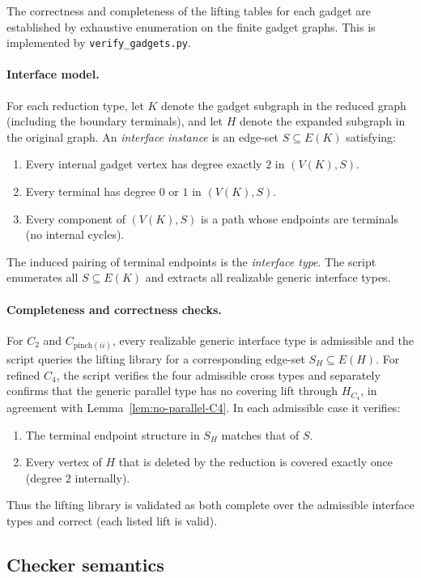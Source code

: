 \documentclass[12pt]{article}
\theoremstyle{definition}
\begin{document}
The correctness and completeness of the lifting tables for each gadget are established by exhaustive
enumeration on the finite gadget graphs. This is implemented by \texttt{verify\_gadgets.py}.

\paragraph{Interface model.}
For each reduction type, let $K$ denote the gadget subgraph in the reduced graph (including the
boundary terminals), and let $H$ denote the expanded subgraph in the original graph.
An \emph{interface instance} is an edge-set $S \subseteq E(K)$ satisfying:
\begin{enumerate}
  \item Every internal gadget vertex has degree exactly $2$ in $(V(K),S)$.
  \item Every terminal has degree $0$ or $1$ in $(V(K),S)$.
  \item Every component of $(V(K),S)$ is a path whose endpoints are terminals (no internal cycles).
\end{enumerate}
The induced pairing of terminal endpoints is the \emph{interface type}.
The script enumerates all $S \subseteq E(K)$ and extracts all realizable generic interface types.

\paragraph{Completeness and correctness checks.}
For $C_2$ and $C_{\mathrm{pinch}(ii)}$, every realizable generic interface type is admissible and the script queries the lifting library for a corresponding
edge-set $S_H \subseteq E(H)$. For refined $C_4$, the script verifies the four admissible cross types and separately confirms that the generic parallel type has no covering lift through $H_{C_4}$, in agreement with Lemma~\ref{lem:no-parallel-C4}. In each admissible case it verifies:
\begin{enumerate}
  \item The terminal endpoint structure in $S_H$ matches that of $S$.
  \item Every vertex of $H$ that is deleted by the reduction is covered exactly once (degree $2$ internally).
\end{enumerate}
Thus the lifting library is validated as both complete over the admissible interface types and correct
(each listed lift is valid).

\subsection{Checker semantics}
\label{subsec:checker-semantics}
\end{document}
